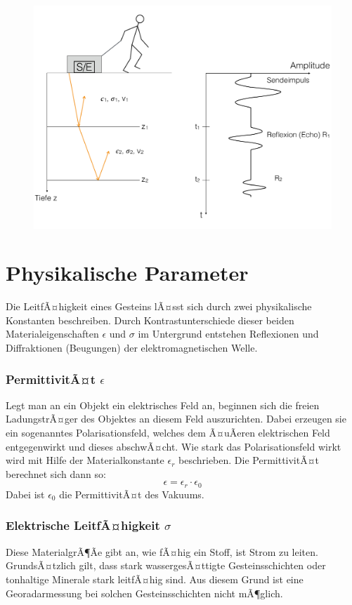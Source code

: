 \begin{figure}[H]
	\centering
	\includegraphics[width = \textwidth]{GeoradarBilder/bewegtMonostatisch}
\end{figure}


\section{Physikalische Parameter}
Die LeitfÃ¤higkeit eines Gesteins lÃ¤sst sich durch zwei physikalische Konstanten beschreiben. Durch Kontrastunterschiede dieser beiden Materialeigenschaften $\epsilon$ und $\sigma$ im Untergrund entstehen Reflexionen und Diffraktionen (Beugungen) der elektromagnetischen Welle.

\subsubsection{PermittivitÃ¤t $\epsilon$} 
Legt man an ein Objekt ein elektrisches Feld an, beginnen sich die freien LadungstrÃ¤ger des Objektes an diesem Feld auszurichten. Dabei erzeugen sie ein sogenanntes Polarisationsfeld, welches dem Ã¤uÃeren elektrischen Feld entgegenwirkt und dieses abschwÃ¤cht. Wie stark das Polarisationsfeld wirkt wird mit Hilfe der Materialkonstante $\epsilon_r$ beschrieben. Die PermittivitÃ¤t berechnet sich dann so: \begin{equation*}
	\epsilon = \epsilon_r \cdot \epsilon_0
\end{equation*} Dabei ist $\epsilon_0$ die PermittivitÃ¤t des Vakuums.

\subsubsection*{Elektrische LeitfÃ¤higkeit $\sigma$}
Diese MaterialgrÃ¶Ãe gibt an, wie fÃ¤hig ein Stoff, ist Strom zu leiten.
GrundsÃ¤tzlich gilt, dass stark wassergesÃ¤ttigte Gesteinsschichten oder tonhaltige Minerale stark leitfÃ¤hig sind. Aus diesem Grund ist eine Georadarmessung bei solchen Gesteinsschichten nicht mÃ¶glich.

